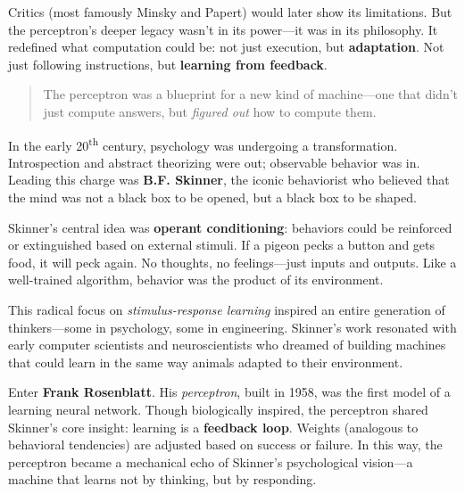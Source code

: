 \medskip

Critics (most famously Minsky and Papert) would later show its limitations. But the perceptron’s deeper legacy wasn’t in its power—it was in its philosophy. It redefined what computation could be: not just execution, but \textbf{adaptation}. Not just following instructions, but \textbf{learning from feedback}.

\begin{quote}
The perceptron was a blueprint for a new kind of machine—one that didn't just compute answers, but \emph{figured out} how to compute them.
\end{quote}


\begin{tcolorbox}[title={\textbf{Historical Sidebar: B.F. Skinner and the Mechanization of Behavior}}, colback=gray!5, colframe=black, fonttitle=\bfseries]

  In the early 20\textsuperscript{th} century, psychology was undergoing a transformation. Introspection and abstract theorizing were out; observable behavior was in. Leading this charge was \textbf{B.F. Skinner}, the iconic behaviorist who believed that the mind was not a black box to be opened, but a black box to be shaped.
  
  Skinner’s central idea was \textbf{operant conditioning}: behaviors could be reinforced or extinguished based on external stimuli. If a pigeon pecks a button and gets food, it will peck again. No thoughts, no feelings—just inputs and outputs. Like a well-trained algorithm, behavior was the product of its environment.
  
  This radical focus on \emph{stimulus-response learning} inspired an entire generation of thinkers—some in psychology, some in engineering. Skinner’s work resonated with early computer scientists and neuroscientists who dreamed of building machines that could learn in the same way animals adapted to their environment.
  
  Enter \textbf{Frank Rosenblatt}. His \textit{perceptron}, built in 1958, was the first model of a learning neural network. Though biologically inspired, the perceptron shared Skinner’s core insight: learning is a \textbf{feedback loop}. Weights (analogous to behavioral tendencies) are adjusted based on success or failure. In this way, the perceptron became a mechanical echo of Skinner’s psychological vision—a machine that learns not by thinking, but by responding.
\end{tcolorbox}

